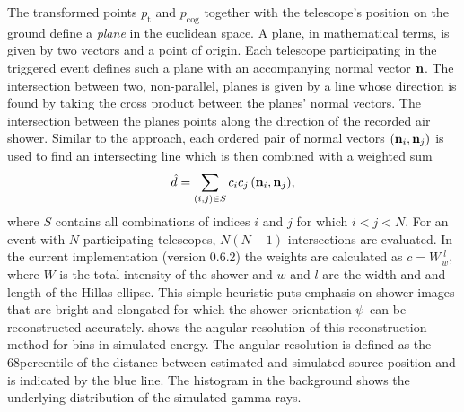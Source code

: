 The transformed points $p_{\text{t}}$ and $p_{\text{cog}}$ together with the telescope's position on the ground define a
\emph{plane} in the euclidean space. A plane, in mathematical terms, is given by two vectors and a point of origin. 
Each telescope participating in the triggered event defines such a plane with an accompanying 
normal vector $\mathbf{n}$. 
The intersection between two, non-parallel, planes 
is given by a line whose direction is found by taking the cross product between the planes' normal vectors.
The intersection between the planes points along the direction of the recorded air shower. 
Similar to the \hegra approach, each ordered pair of normal vectors $(\mathbf{n}_i, \mathbf{n}_j)$ is used to find an intersecting line which is then combined with a weighted sum 
\begin{equation*}
    \hat{d} = \sum_{(i, j) \in S} c_i c_j \,  (\mathbf{n}_i, \mathbf{n}_j),
\end{equation*}
where $S$ contains all combinations of indices $i$ and $j$ for which $i < j < N$. For an event with $N$ participating telescopes, $N(N - 1)$ intersections are evaluated.
In the current \ctapipe implementation (version 0.6.2) the weights are calculated as $c = W \frac{l}{w}$, where $W$ is the total intensity of the shower and $w$ and $l$
are the width and and length of the Hillas ellipse.
This simple heuristic puts emphasis on shower images that are bright and elongated for which the shower orientation $\psi$ can be reconstructed accurately.
 shows the angular resolution of this reconstruction method for bins in simulated energy. 
The angular resolution is defined as the 68\th percentile of the distance between estimated and simulated source position and is indicated by the blue line. 
The histogram in the background shows the underlying distribution of the simulated gamma rays. 


